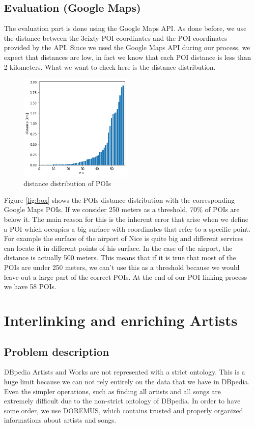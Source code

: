 \documentclass[paper=a4, fontsize=11pt]{scrartcl}
\begin{document}
\subsection{Evaluation (Google Maps)}
The evaluation part is done using the Google Maps API. As done before, we use the distance between the 3cixty POI coordinates and the POI coordinates provided by the API. Since we used the Google Maps API during our process, we expect that distances are low, in fact we know that each POI distance is less than 2 kilometers. What we want to check here is the distance distribution.

\begin{figure}[!htb]
  \centering
    \includegraphics[width=0.5\textwidth]{images/distance.png}
    \caption{distance distribution of POIs}
    \label{fig:poidist}
\end{figure}

Figure \ref{fig:box} shows the POIs distance distribution with the corresponding Google Maps POIs. If we consider 250 meters as a threshold, 70\% of POIs are below it. The main reason for this is the inherent error that arise when we define a POI which occupies a big surface with coordinates that refer to a specific point. For example the surface of the airport of Nice is quite big and different services can locate it in different points of his surface. In the case of the airport, the distance is actually 500 meters. This means that if it is true that most of the POIs are under 250 meters, we can't use this as a threshold because we would leave out a large part of the correct POIs.
At the end of our POI linking process we have 58 POIs.

\section{Interlinking and enriching Artists}
\subsection{Problem description}
DBpedia Artists and Works are not represented with a strict ontology.
This is a huge limit because we can not rely entirely on the data that we have in DBpedia. Even the simpler operations, such as finding all artists and all songs are extremely difficult due to the non-strict ontology of DBpedia. In order to have some order, we use DOREMUS, which contains trusted and properly organized informations about artists and songs.
\end{document}
